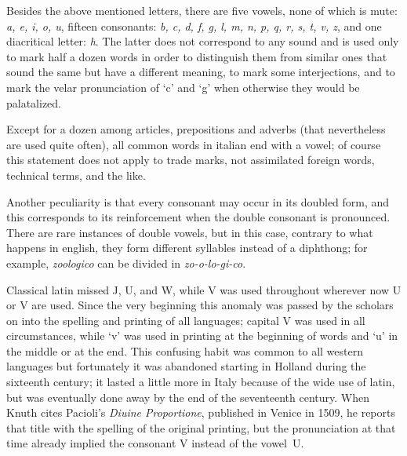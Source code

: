Besides the above mentioned letters, there are five vowels, none of which is
mute: {\it a, e, i, o, u}, fifteen consonants: {\it b, c, d, f, g, l, m,  n,
p,  q,  r, s, t, v, z}, and one diacritical letter: {\it h}. The latter does
not correspond to any sound and is used only to mark half a dozen  words  in
order  to  distinguish them from similar ones that sound the same but have a
different meaning, to  mark  some  interjections,  and  to  mark  the  velar
pronunciation  of  `c'  and `g' when otherwise they would be palatalized. 

\begin{comment}
In  total  there  are  26  signs,  but,  in  spite  of  the modern times, in
elementary school they keep teaching that the italian alphabet  contains  21
letters;  in  facts  they  are having troubles with the children with exotic
names such as John, Katia, Xenobia, Yuri, Walter and the like; these  names,
due  to  the  influence of the mass media, are now very common (well\dots, I
know just one person named Xenobia, but there are other names containing the
letter `x').
\end{comment}

Except    for  a  dozen  among  articles,  prepositions  and  adverbs  (that
nevertheless are used quite often), all common words in italian end  with  a
vowel;  of  course  this  statement  does  not  apply  to  trade  marks, not
assimilated foreign words, technical terms, and the like.

Another  peculiarity  is that every consonant may occur in its doubled form,
and this corresponds to its  reinforcement  when  the  double  consonant  is
pronounced.  There  are  rare  instances of double vowels, but in this case,
contrary to what happens in english, they form different  syllables  instead
of  a  diphthong;  for  example,  {\it  zoologico}  can  be  divided in {\it
zo-o-lo-gi-co}.

 Classical latin missed J, U, and W, while V was used
throughout wherever now U or V are  used.  Since  the  very  beginning  this
anomaly  was passed by the scholars on into the spelling and printing of all
languages; capital V was used in all circumstances, while `v'  was  used  in
printing at the beginning of words and `u' in the middle or at the end. This
confusing habit was common to all western languages but fortunately  it  was
abandoned  starting  in  Holland  during  the sixteenth century; it lasted a
little more in Italy because of the wide use of latin,  but  was  eventually
done  away by the end of the seventeenth century. When Knuth \cite[reference
106]{knuth} cites Pacioli's {\it Diuine Proportione}, published in Venice in
1509,  he reports that title with the spelling of the original printing, but
the pronunciation at that time already implied the consonant  V  instead  of
the vowel~U.

